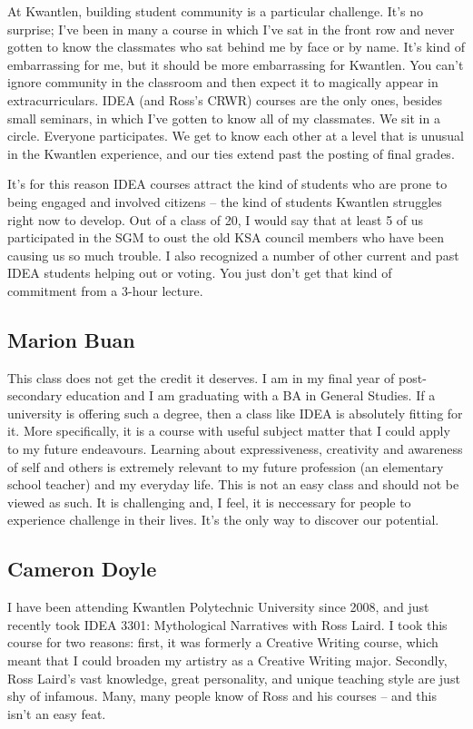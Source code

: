 \documentclass[letterpaper,10pt,headsepline]{scrreprt}
\begin{document}
At Kwantlen, building student community is a particular challenge. It's no surprise; I've been in many a course in which I've sat in the front row and never gotten to know the classmates who sat behind me by face or by name. It's kind of embarrassing for me, but it should be more embarrassing for Kwantlen. You can't ignore community in the classroom and then expect it to magically appear in extracurriculars. IDEA (and Ross's CRWR) courses are the only ones, besides small seminars, in which I've gotten to know all of my classmates. We sit in a circle. Everyone participates. We get to know each other at a level that is unusual in the Kwantlen experience, and our ties extend past the posting of final grades.

It's for this reason IDEA courses attract the kind of students who are prone to being engaged and involved citizens -- the kind of students Kwantlen struggles right now to develop. Out of a class of 20, I would say that at least 5 of us participated in the SGM to oust the old KSA council members who have been causing us so much trouble. I also recognized a number of other current and past IDEA students helping out or voting. You just don't get that kind of commitment from a 3-hour lecture.

\subsection{Marion Buan}

This class does not get the credit it deserves. I am in my final year of post-secondary education and I am graduating with a BA in General Studies. If a university is offering such a degree, then a class like IDEA is absolutely fitting for it. More specifically, it is a course with useful subject matter that I could apply to my future endeavours. Learning about expressiveness, creativity and awareness of self and others is extremely relevant to my future profession (an elementary school teacher) and my everyday life. This is not an easy class and should not be viewed as such. It is challenging and, I feel, it is neccessary for people to experience challenge in their lives. It's the only way to discover our potential.

\subsection{Cameron Doyle}

I have been attending Kwantlen Polytechnic University since 2008, and just
recently took IDEA 3301: Mythological Narratives with Ross Laird. I took
this course for two reasons: first, it was formerly a Creative Writing
course, which meant that I could broaden my artistry as a Creative Writing
major. Secondly, Ross Laird's vast knowledge, great personality, and unique
teaching style are just shy of infamous. Many, many people know of Ross and
his courses -- and this isn't an easy feat.
\end{document}
